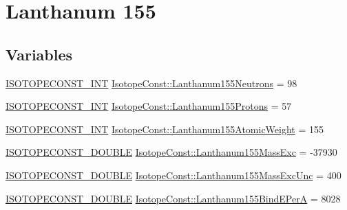 \hypertarget{group___isotope_const-_lanthanum-_la155}{}\section{Lanthanum 155}
\label{group___isotope_const-_lanthanum-_la155}
\subsection*{Variables}
\begin{DoxyCompactItemize}
\item 
\mbox{\hyperlink{group___isotope_const-_macros_ga5f18360b3e99483a35c32d789e62621c}{I\+S\+O\+T\+O\+P\+E\+C\+O\+N\+S\+T\+\_\+\+I\+NT}} \mbox{\hyperlink{group___isotope_const-_lanthanum-_la155_gaec5e6fe5cd2b0c13889bc6798459a9e3}{Isotope\+Const\+::\+Lanthanum155\+Neutrons}} = 98
\item 
\mbox{\hyperlink{group___isotope_const-_macros_ga5f18360b3e99483a35c32d789e62621c}{I\+S\+O\+T\+O\+P\+E\+C\+O\+N\+S\+T\+\_\+\+I\+NT}} \mbox{\hyperlink{group___isotope_const-_lanthanum-_la155_ga6965da4555edaabea3356dcca17632ec}{Isotope\+Const\+::\+Lanthanum155\+Protons}} = 57
\item 
\mbox{\hyperlink{group___isotope_const-_macros_ga5f18360b3e99483a35c32d789e62621c}{I\+S\+O\+T\+O\+P\+E\+C\+O\+N\+S\+T\+\_\+\+I\+NT}} \mbox{\hyperlink{group___isotope_const-_lanthanum-_la155_ga5c6d34fc8c26c29430a59129a01f9bdc}{Isotope\+Const\+::\+Lanthanum155\+Atomic\+Weight}} = 155
\item 
\mbox{\hyperlink{group___isotope_const-_macros_ga8f45a7272ce02c0b4c65c44636ed719a}{I\+S\+O\+T\+O\+P\+E\+C\+O\+N\+S\+T\+\_\+\+D\+O\+U\+B\+LE}} \mbox{\hyperlink{group___isotope_const-_lanthanum-_la155_ga088d50a828dbc5d9a633d17cf5518f34}{Isotope\+Const\+::\+Lanthanum155\+Mass\+Exc}} = -\/37930
\item 
\mbox{\hyperlink{group___isotope_const-_macros_ga8f45a7272ce02c0b4c65c44636ed719a}{I\+S\+O\+T\+O\+P\+E\+C\+O\+N\+S\+T\+\_\+\+D\+O\+U\+B\+LE}} \mbox{\hyperlink{group___isotope_const-_lanthanum-_la155_ga9952ebee8e23b79005d70628398ef18e}{Isotope\+Const\+::\+Lanthanum155\+Mass\+Exc\+Unc}} = 400
\item 
\mbox{\hyperlink{group___isotope_const-_macros_ga8f45a7272ce02c0b4c65c44636ed719a}{I\+S\+O\+T\+O\+P\+E\+C\+O\+N\+S\+T\+\_\+\+D\+O\+U\+B\+LE}} \mbox{\hyperlink{group___isotope_const-_lanthanum-_la155_ga2f9a540ed9734a123211eb0c2469caf0}{Isotope\+Const\+::\+Lanthanum155\+Bind\+E\+PerA}} = 8028
\item 

\end{DoxyCompactItemize}
